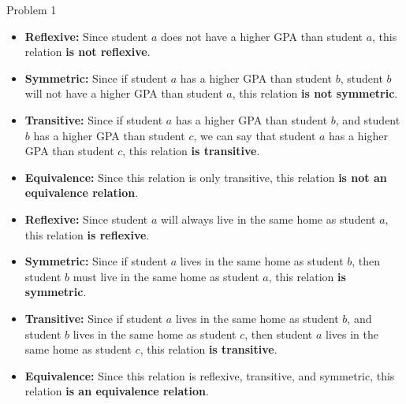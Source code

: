 \begin{problem}{Problem 1}
    \begin{highlight}
        \begin{itemize}
            \item \textbf{Reflexive:} Since student $a$ does not have a higher GPA than student $a$, this relation \textbf{is not reflexive}.
            \item \textbf{Symmetric:} Since if student $a$ has a higher GPA than student $b$, student $b$ will not have a higher GPA than student $a$, this relation \textbf{is not symmetric}.
            \item \textbf{Transitive:} Since if student $a$ has a higher GPA than student $b$, and student $b$ has a higher GPA than student $c$, we can say that student $a$ has a higher GPA than student
            $c$, this relation \textbf{is transitive}.
            \item \textbf{Equivalence:} Since this relation is only transitive, this relation \textbf{is not an equivalence relation}.
        \end{itemize}
    \end{highlight}

    \begin{highlight}
        \begin{itemize}
            \item \textbf{Reflexive:} Since student $a$ will always live in the same home as student $a$, this relation \textbf{is reflexive}.
            \item \textbf{Symmetric:} Since if student $a$ lives in the same home as student $b$, then student $b$ must live in the same home as student $a$, this relation \textbf{is symmetric}.
            \item \textbf{Transitive:} Since if student $a$ lives in the same home as student $b$, and student $b$ lives in the same home as student $c$, then student $a$ lives in the same home as
            student $c$, this relation \textbf{is transitive}.
            \item \textbf{Equivalence:} Since this relation is reflexive, transitive, and symmetric, this relation \textbf{is an equivalence relation}.
        \end{itemize}
    \end{highlight}
\end{problem}

